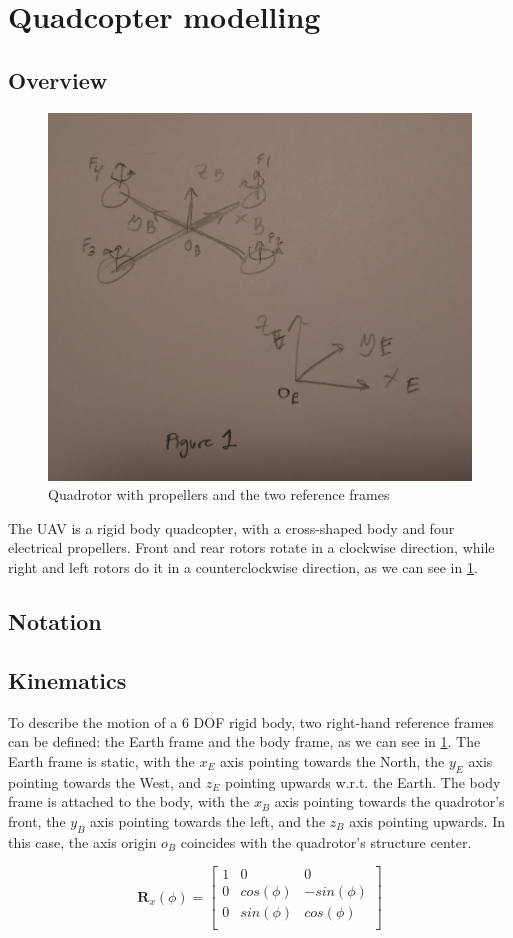 \documentclass[journal]{IEEEtran}
\begin{document}
\section{Quadcopter modelling}
	\subsection{Overview}
		
		\begin{figure}
		\centering
		\includegraphics[width=.5\linewidth]{frames_rotors}
		\caption{Quadrotor with propellers and the two reference frames}
		\label{fig:frames_rotors}
		\end{figure}

	The UAV is a rigid body quadcopter, with a cross-shaped body and four electrical propellers. Front and rear rotors rotate in a clockwise direction, while right and left rotors do it in a counterclockwise direction, as we can see in \figurename \ref{fig:frames_rotors}. 
	\subsection{Notation}
	\subsection{Kinematics}
	To describe the motion of a 6 DOF rigid body, two right-hand reference frames can be defined: the Earth frame and the body frame, as we can see in \figurename \ref{fig:frames_rotors}. The Earth frame is static, with the $x_E$ axis pointing towards the North, the $y_E$ axis pointing towards the West, and $z_E$ pointing upwards w.r.t. the Earth. The body frame is attached to the body, with the $x_B$ axis pointing towards the quadrotor's front, the $y_B$ axis pointing towards the left, and the $z_B$ axis pointing upwards. In this case, the axis origin $o_B$ coincides with the quadrotor's structure center. 
	
	 \begin{equation} \label{eq:rotx}
	 	\textbf{R}_x (\phi)=
	 	\left[ {\begin{array}{ccc}
	 		1 & 0 & 0 \\
	 		0 & cos(\phi) & -sin(\phi) \\
	 		0 &  sin(\phi) & cos(\phi) \\ 
	 		\end{array} } \right]
	 \end{equation}  
\end{document}
